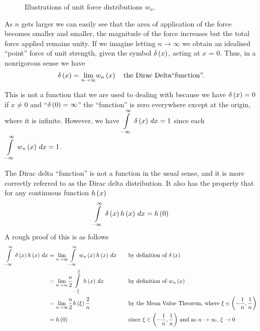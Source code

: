 \begin{figure}[htbp] \centering
  
  \caption{Illustrations of unit force distributions $w_{n}$.}
  \label{fig:unitf}
\end{figure}

As $n$ gets larger we can easily see that the area of application of the force
becomes smaller and smaller, the magnitude of the force increases but the
total force applied remains unity.  If we imagine letting $n \rightarrow
\infty$ we obtain an idealised ``point'' force of unit strength, given the
symbol $ \delta\left( x \right) $, acting at $x$ = 0.  Thus, in a nonrigorous sense we have
\begin{equation*}
     \delta\left( x \right)  = \displaystyle{\lim_{n \rightarrow \infty}}
     w_{n}\left( x \right)  \quad \text{the Dirac Delta``function''.}
\end{equation*}

This is not a function that we are used to dealing with because we have
$ \delta\left( x \right)  = 0$ if $x \neq 0$ and ``$ \delta\left( 0 \right)  = \infty $'' \ie
the ``function'' is zero everywhere except at the origin, where it is
infinite.  However, we have $  \displaystyle\int\limits_{-\infty}^{\infty} \, \delta\left( x \right) \,dx  = 1$
since each $  \displaystyle\int\limits_{-\infty}^{\infty} \, w_{n}\left( x \right) \,dx  = 1$.

The Dirac delta ``function'' is not a function in the usual sense, and it is
more correctly referred to as the Dirac delta distribution.  It also has the
property that for any continuous function $ h\left( x \right) $
\begin{equation}
    \displaystyle\int\limits_{-\infty}^{\infty} \, \delta\left( x \right)  h\left( x \right) \,dx  =  h\left( 0 \right) 
  \label{eqn:contfn}
\end{equation}
A rough proof of this is as follows
  \begin{alignat*}{2}
      \displaystyle\int\limits_{-\infty}^{\infty} \, \delta\left( x \right)  h\left( x \right) \,dx  &=
    \displaystyle{\lim_{n \rightarrow \infty}}
      \displaystyle\int\limits_{-\infty}^{\infty} \, w_{n}\left( x \right)  h\left( x \right) \,dx  \quad && \text{by
      definition of $ \delta\left( x \right) $} \\ 
    &= \displaystyle{\lim_{n\rightarrow \infty}} \dfrac{n}{2}
      \displaystyle\int\limits_{-\frac{1}{n}}^{\frac{1}{n}} \, h\left( x \right) \,dx  && \text{by definition
      of $ w_{n}\left( x \right) $} \\ &= \displaystyle{\lim_{n \rightarrow
        \infty}} \dfrac{n}{2}  h\left( \xi \right) \dfrac{2}{n} && \text{by the Mean
      Value Theorem, where $\xi \in\left( -\dfrac{1}{n},\dfrac{1}{n} \right)$} \\ &=
     h\left( 0 \right)  && \text{since $\xi \in\left( -\dfrac{1}{n},\dfrac{1}{n} \right)$ and
      as $n\rightarrow \infty,\medspace \xi \rightarrow 0$}
  \end{alignat*}

